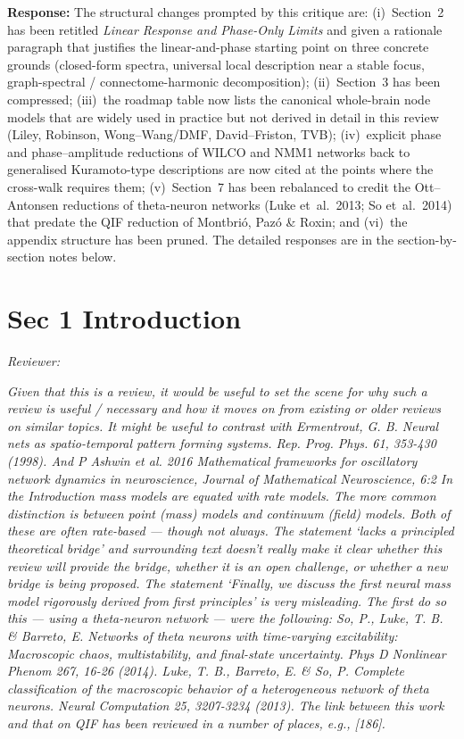 \documentclass[12pt,a4paper]{article}
\newcommand{\reviewercomment}[1]{\par\smallskip\noindent\textit{Reviewer:}\par\smallskip\begingroup\itshape #1\par\endgroup\smallskip}
\newcommand{\ourresponse}[1]{\par\noindent\textbf{Response:} #1\par\medskip}
\begin{document}
\ourresponse{The structural changes prompted by this critique are: (i)~Section~2 has been retitled \emph{Linear Response and Phase-Only Limits} and given a rationale paragraph that justifies the linear-and-phase starting point on three concrete grounds (closed-form spectra, universal local description near a stable focus, graph-spectral / connectome-harmonic decomposition); (ii)~Section~3 has been compressed; (iii)~the roadmap table now lists the canonical whole-brain node models that are widely used in practice but not derived in detail in this review (Liley, Robinson, Wong--Wang/DMF, David--Friston, TVB); (iv)~explicit phase and phase--amplitude reductions of WILCO and NMM1 networks back to generalised Kuramoto-type descriptions are now cited at the points where the cross-walk requires them; (v)~Section~7 has been rebalanced to credit the Ott--Antonsen reductions of theta-neuron networks (Luke et~al.~2013; So et~al.~2014) that predate the QIF reduction of Montbri\'o, Paz\'o \& Roxin; and (vi)~the appendix structure has been pruned. The detailed responses are in the section-by-section notes below.
}

\section*{Sec 1 Introduction}

\reviewercomment{Given that this is a review, it would be useful to set the scene for why such a review is useful / necessary and how it moves on from existing or older reviews on similar topics. It might be useful to contrast with Ermentrout, G. B. Neural nets as spatio-temporal pattern forming systems. Rep. Prog. Phys. 61, 353-430 (1998). And P Ashwin et al. 2016 Mathematical frameworks for oscillatory network dynamics in neuroscience, Journal of Mathematical Neuroscience, 6:2 In the Introduction mass models are equated with rate models. The more common distinction is between point (mass) models and continuum (field) models. Both of these are often rate-based --- though not always. The statement `lacks a principled theoretical bridge' and surrounding text doesn't really make it clear whether this review will provide the bridge, whether it is an open challenge, or whether a new bridge is being proposed. The statement `Finally, we discuss the first neural mass model rigorously derived from first principles' is very misleading. The first do so this --- using a theta-neuron network --- were the following: So, P., Luke, T. B. \& Barreto, E. Networks of theta neurons with time-varying excitability: Macroscopic chaos, multistability, and final-state uncertainty. Phys D Nonlinear Phenom 267, 16-26 (2014). Luke, T. B., Barreto, E. \& So, P. Complete classification of the macroscopic behavior of a heterogeneous network of theta neurons. Neural Computation 25, 3207-3234 (2013). The link between this work and that on QIF has been reviewed in a number of places, e.g., [186].}
\end{document}
